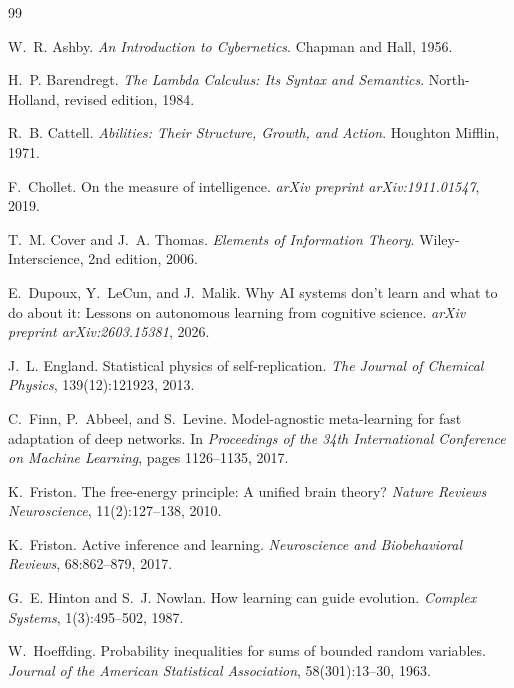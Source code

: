 \documentclass[11pt]{article}
\theoremstyle{definition}
\theoremstyle{remark}
\begin{document}

\begin{thebibliography}{99}

W.~R. Ashby.
\newblock \emph{An Introduction to Cybernetics}.
\newblock Chapman and Hall, 1956.

H.~P. Barendregt.
\newblock \emph{The Lambda Calculus: Its Syntax and Semantics}.
\newblock North-Holland, revised edition, 1984.

R.~B. Cattell.
\newblock \emph{Abilities: Their Structure, Growth, and Action}.
\newblock Houghton Mifflin, 1971.

F.~Chollet.
\newblock On the measure of intelligence.
\newblock \emph{arXiv preprint arXiv:1911.01547}, 2019.

T.~M. Cover and J.~A. Thomas.
\newblock \emph{Elements of Information Theory}.
\newblock Wiley-Interscience, 2nd edition, 2006.

E.~Dupoux, Y.~LeCun, and J.~Malik.
\newblock Why {AI} systems don't learn and what to do about it: Lessons on
  autonomous learning from cognitive science.
\newblock \emph{arXiv preprint arXiv:2603.15381}, 2026.

J.~L. England.
\newblock Statistical physics of self-replication.
\newblock \emph{The Journal of Chemical Physics}, 139(12):121923, 2013.

C.~Finn, P.~Abbeel, and S.~Levine.
\newblock Model-agnostic meta-learning for fast adaptation of deep networks.
\newblock In \emph{Proceedings of the 34th International Conference on Machine
  Learning}, pages 1126--1135, 2017.

K.~Friston.
\newblock The free-energy principle: A unified brain theory?
\newblock \emph{Nature Reviews Neuroscience}, 11(2):127--138, 2010.

K.~Friston.
\newblock Active inference and learning.
\newblock \emph{Neuroscience and Biobehavioral Reviews}, 68:862--879, 2017.

G.~E. Hinton and S.~J. Nowlan.
\newblock How learning can guide evolution.
\newblock \emph{Complex Systems}, 1(3):495--502, 1987.

W.~Hoeffding.
\newblock Probability inequalities for sums of bounded random variables.
\newblock \emph{Journal of the American Statistical Association},
  58(301):13--30, 1963.


\end{thebibliography}
\end{document}

